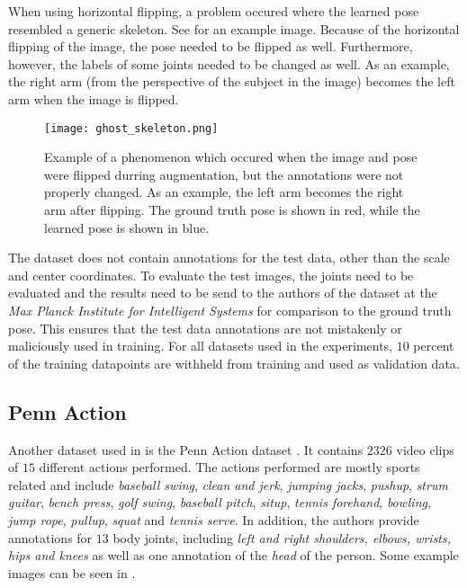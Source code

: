 When using horizontal flipping, a problem occured where the learned pose resembled a generic skeleton.
See  for an example image.
Because of the horizontal flipping of the image, the pose needed to be flipped as well.
Furthermore, however, the labels of some joints needed to be changed as well.
As an example, the right arm (from the perspective of the subject in the image) becomes the left arm when the image is flipped.

\begin{figure}[htb!]
    \centering
    \texttt{[image: ghost\_skeleton.png]}
    \caption{Example of a phenomenon which occured when the image and pose were flipped durring augmentation, but the annotations were not properly changed. As an example, the left arm becomes the right arm after flipping. The ground truth pose is shown in red, while the learned pose is shown in blue. }
    \label{fig:ghost_skeleton}
\end{figure}

The dataset does not contain annotations for the test data, other than the scale and center coordinates.
To evaluate the test images, the joints need to be evaluated and the results need to be send to the authors of the dataset at the \textit{Max Planck Institute for Intelligent Systems} for comparison to the ground truth pose.
This ensures that the test data annotations are not mistakenly or maliciously used in training.
For all datasets used in the experiments, $10$ percent of the training datapoints are withheld from training and used as validation data.

\subsection{Penn Action}
\label{sec:exp-penn}

Another dataset used in \cite{luvizon_2d/3d_2018} is the Penn Action dataset \cite{zhang_actemes_2013}.
It contains $2326$ video clips of $15$ different actions performed.
The actions performed are mostly sports related and include \textit{baseball swing}, \textit{clean and jerk}, \textit{jumping jacks}, \textit{pushup}, \textit{strum guitar}, \textit{bench press}, \textit{golf swing}, \textit{baseball pitch}, \textit{situp}, \textit{tennis forehand}, \textit{bowling}, \textit{jump rope}, \textit{pullup}, \textit{squat} and \textit{tennis serve}.
In addition, the authors provide annotations for $13$ body joints,
including \textit{left and right shoulders, elbows, wrists, hips and knees} as well as one annotation of the \textit{head} of the person.
Some example images can be seen in . 

